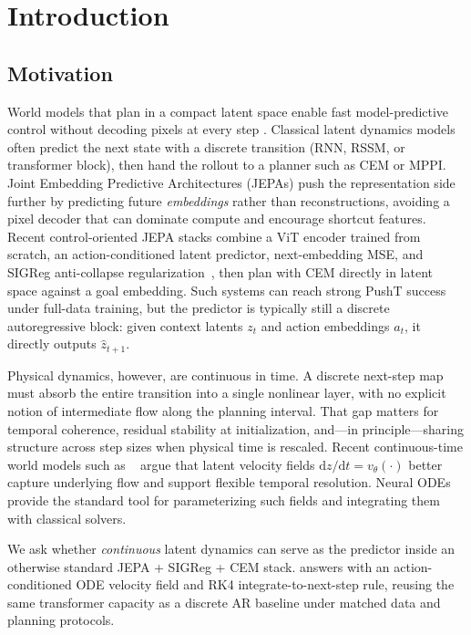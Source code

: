 \section{Introduction}
\label{sec:intro}

\subsection{Motivation}
\label{sec:motivation}

World models that plan in a compact latent space enable fast
model-predictive control without decoding pixels at every step
\cite{ha2018worldmodels,hafner2019planet}.
Classical latent dynamics models often predict the next state with a
discrete transition (RNN, RSSM, or transformer block), then hand the
rollout to a planner such as CEM or MPPI.
Joint Embedding Predictive Architectures (JEPAs)
\cite{assran2023jepa} push the representation side further by
predicting future \emph{embeddings} rather than reconstructions,
avoiding a pixel decoder that can dominate compute and encourage
shortcut features.
Recent control-oriented JEPA stacks combine a ViT encoder trained from
scratch, an action-conditioned latent predictor, next-embedding MSE, and
SIGReg anti-collapse regularization~\cite{balestriero2025lejepa}, then
plan with CEM directly in latent space against a goal embedding.
Such systems can reach strong PushT success under full-data training,
but the predictor is typically still a discrete autoregressive block:
given context latents $z_t$ and action embeddings $a_t$, it directly
outputs $\hat z_{t+1}$.

Physical dynamics, however, are continuous in time.
A discrete next-step map must absorb the entire transition into a
single nonlinear layer, with no explicit notion of intermediate flow
along the planning interval.
That gap matters for temporal coherence, residual stability at
initialization, and---in principle---sharing structure across step
sizes when physical time is rescaled.
Recent continuous-time world models such as
\PriorODEWorld{}~\cite{liu2026odeworld} argue that latent velocity fields
$\mathrm{d}z/\mathrm{d}t = v_\theta(\cdot)$ better capture underlying
flow and support flexible temporal resolution.
Neural ODEs~\cite{chen2018neuralode} provide the standard tool for
parameterizing such fields and integrating them with classical
solvers.

We ask whether \emph{continuous} latent dynamics can serve as the
predictor inside an otherwise standard JEPA + SIGReg + CEM stack.
\method{} answers with an action-conditioned ODE velocity field and
RK4 integrate-to-next-step rule, reusing the same transformer capacity
as a discrete AR baseline under matched data and planning protocols.


